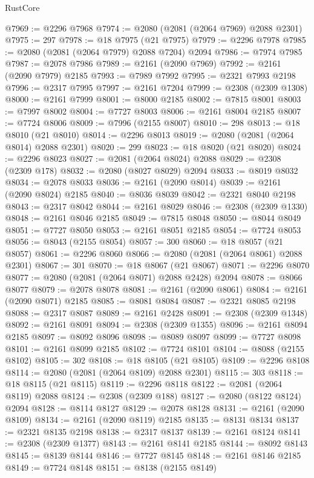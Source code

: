 \begin{lexlean}{RustCore}
\begin{coremodule}
@7969 := @2296 @7968
@7974 := @2080 (@2081 (@2064 @7969) @2088 @2301)
@7975 := 297
@7978 := @18 @7975 (@21 @7975)
@7979 := @2296 @7978
@7985 := @2080 (@2081 (@2064 @7979) @2088 @7204) @2094
@7986 := @7974 @7985
@7987 := @2078 @7986
@7989 := @2161 (@2090 @7969)
@7992 := @2161 (@2090 @7979) @2185
@7993 := @7989 @7992
@7995 := @2321 @7993 @2198
@7996 := @2317 @7995
@7997 := @2161 @7204
@7999 := @2308 (@2309 @1308)
@8000 := @2161 @7999
@8001 := @8000 @2185
@8002 := @7815 @8001
@8003 := @7997 @8002
@8004 := @7727 @8003
@8006 := @2161 @8004 @2185
@8007 := @7724 @8006
@8009 := @7996 (@2155 @8007)
@8010 := 298
@8013 := @18 @8010 (@21 @8010)
@8014 := @2296 @8013
@8019 := @2080 (@2081 (@2064 @8014) @2088 @2301)
@8020 := 299
@8023 := @18 @8020 (@21 @8020)
@8024 := @2296 @8023
@8027 := @2081 (@2064 @8024) @2088
@8029 := @2308 (@2309 @178)
@8032 := @2080 (@8027 @8029) @2094
@8033 := @8019 @8032
@8034 := @2078 @8033
@8036 := @2161 (@2090 @8014)
@8039 := @2161 (@2090 @8024) @2185
@8040 := @8036 @8039
@8042 := @2321 @8040 @2198
@8043 := @2317 @8042
@8044 := @2161 @8029
@8046 := @2308 (@2309 @1330)
@8048 := @2161 @8046 @2185
@8049 := @7815 @8048
@8050 := @8044 @8049
@8051 := @7727 @8050
@8053 := @2161 @8051 @2185
@8054 := @7724 @8053
@8056 := @8043 (@2155 @8054)
@8057 := 300
@8060 := @18 @8057 (@21 @8057)
@8061 := @2296 @8060
@8066 := @2080 (@2081 (@2064 @8061) @2088 @2301)
@8067 := 301
@8070 := @18 @8067 (@21 @8067)
@8071 := @2296 @8070
@8077 := @2080 (@2081 (@2064 @8071) @2088 @2428) @2094
@8078 := @8066 @8077
@8079 := @2078 @8078
@8081 := @2161 (@2090 @8061)
@8084 := @2161 (@2090 @8071) @2185
@8085 := @8081 @8084
@8087 := @2321 @8085 @2198
@8088 := @2317 @8087
@8089 := @2161 @2428
@8091 := @2308 (@2309 @1348)
@8092 := @2161 @8091
@8094 := @2308 (@2309 @1355)
@8096 := @2161 @8094 @2185
@8097 := @8092 @8096
@8098 := @8089 @8097
@8099 := @7727 @8098
@8101 := @2161 @8099 @2185
@8102 := @7724 @8101
@8104 := @8088 (@2155 @8102)
@8105 := 302
@8108 := @18 @8105 (@21 @8105)
@8109 := @2296 @8108
@8114 := @2080 (@2081 (@2064 @8109) @2088 @2301)
@8115 := 303
@8118 := @18 @8115 (@21 @8115)
@8119 := @2296 @8118
@8122 := @2081 (@2064 @8119) @2088
@8124 := @2308 (@2309 @188)
@8127 := @2080 (@8122 @8124) @2094
@8128 := @8114 @8127
@8129 := @2078 @8128
@8131 := @2161 (@2090 @8109)
@8134 := @2161 (@2090 @8119) @2185
@8135 := @8131 @8134
@8137 := @2321 @8135 @2198
@8138 := @2317 @8137
@8139 := @2161 @8124
@8141 := @2308 (@2309 @1377)
@8143 := @2161 @8141 @2185
@8144 := @8092 @8143
@8145 := @8139 @8144
@8146 := @7727 @8145
@8148 := @2161 @8146 @2185
@8149 := @7724 @8148
@8151 := @8138 (@2155 @8149)

\end{coremodule}
\end{lexlean}
